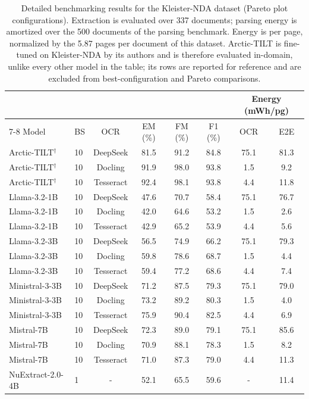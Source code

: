 \begin{table}[ht]
\caption{Detailed benchmarking results for the Kleister-NDA dataset (Pareto plot configurations). Extraction is evaluated over 337 documents; parsing energy is amortized over the 500 documents of the parsing benchmark. Energy is per page, normalized by the 5.87 pages per document of this dataset. Arctic-TILT is fine-tuned on Kleister-NDA by its authors and is therefore evaluated in-domain, unlike every other model in the table; its rows are reported for reference and are excluded from best-configuration and Pareto comparisons.}
\label{tab:kleister_nda_plot_results}
\begin{tabular}{llcccccc}
\toprule
& & & & & & \multicolumn{2}{c}{Energy (mWh/pg)} \\
\cmidrule(lr){7-8}
Model & BS & OCR & EM (\%) & FM (\%) & F1 (\%) & OCR & E2E \\
\midrule
Arctic-TILT$^\dagger$ & 10 & DeepSeek & 81.5 & 91.2 & 84.8 & 75.1 & 81.3 \\
Arctic-TILT$^\dagger$ & 10 & Docling & 91.9 & 98.0 & 93.8 & 1.5 & 9.2 \\
Arctic-TILT$^\dagger$ & 10 & Tesseract & 92.4 & 98.1 & 93.8 & 4.4 & 11.8 \\
Llama-3.2-1B & 10 & DeepSeek & 47.6 & 70.7 & 58.4 & 75.1 & 76.7 \\
Llama-3.2-1B & 10 & Docling & 42.0 & 64.6 & 53.2 & 1.5 & 2.6 \\
Llama-3.2-1B & 10 & Tesseract & 42.9 & 65.2 & 53.9 & 4.4 & 5.6 \\
Llama-3.2-3B & 10 & DeepSeek & 56.5 & 74.9 & 66.2 & 75.1 & 79.3 \\
Llama-3.2-3B & 10 & Docling & 59.8 & 78.6 & 68.7 & 1.5 & 4.4 \\
Llama-3.2-3B & 10 & Tesseract & 59.4 & 77.2 & 68.6 & 4.4 & 7.4 \\
Ministral-3-3B & 10 & DeepSeek & 71.2 & 87.5 & 79.3 & 75.1 & 79.0 \\
Ministral-3-3B & 10 & Docling & 73.2 & 89.2 & 80.3 & 1.5 & 4.0 \\
Ministral-3-3B & 10 & Tesseract & 75.9 & 90.4 & 82.5 & 4.4 & 6.9 \\
Mistral-7B & 10 & DeepSeek & 72.3 & 89.0 & 79.1 & 75.1 & 85.6 \\
Mistral-7B & 10 & Docling & 70.9 & 88.1 & 78.3 & 1.5 & 8.2 \\
Mistral-7B & 10 & Tesseract & 71.0 & 87.3 & 79.0 & 4.4 & 11.3 \\
NuExtract-2.0-4B & 1 & - & 52.1 & 65.5 & 59.6 & - & 11.4 \\

\end{tabular}
\end{table}
